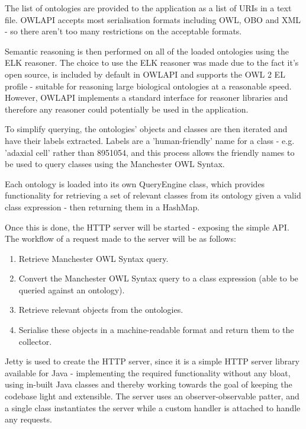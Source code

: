 \documentclass{article}
\begin{document}
The list of ontologies are provided to the application as a list of
URIs in a text file. OWLAPI accepts most serialisation formats including OWL,
OBO and XML - so there aren't too many restrictions on the acceptable formats. 

Semantic reasoning is then performed on all of the loaded ontologies using the
ELK reasoner. The choice to use the ELK reasoner was made due to the fact it's
open source, is included by default in OWLAPI and supports the OWL 2 EL profile
- suitable for reasoning large biological ontologies at a reasonable speed. 
However, OWLAPI implements a standard interface for reasoner libraries and 
therefore any reasoner could potentially be used in the application.

To simplify querying, the ontologies' objects and classes are then iterated and
have their labels extracted. Labels are a 'human-friendly' name for a class -
e.g. 'adaxial cell' rather than 8951054, and this process allows the friendly
names to be used to query classes using the Manchester OWL Syntax.

Each ontology is loaded into its own QueryEngine class, which provides
functionality for retrieving a set of relevant classes from its ontology given a
valid class expression - then returning them in a HashMap.

Once this is done, the HTTP server will be started - exposing the simple API. 
The workflow of a request made to the server will be as follows:

\begin{enumerate}
    \item Retrieve Manchester OWL Syntax query.
    \item Convert the Manchester OWL Syntax query to a class expression (able to
    be queried against an ontology).
    \item Retrieve relevant objects from the ontologies.
    \item Serialise these objects in a machine-readable format and return them 
    to the collector.
\end{enumerate}

Jetty is used to create the HTTP server, since it is a simple HTTP server
library available for Java - implementing the required functionality without any
bloat, using in-built Java classes and thereby working towards the goal of
keeping the codebase light and extensible. The server uses an
observer-observable patter, and a single class instantiates the server while a
custom handler is attached to handle any requests.
\end{document}
